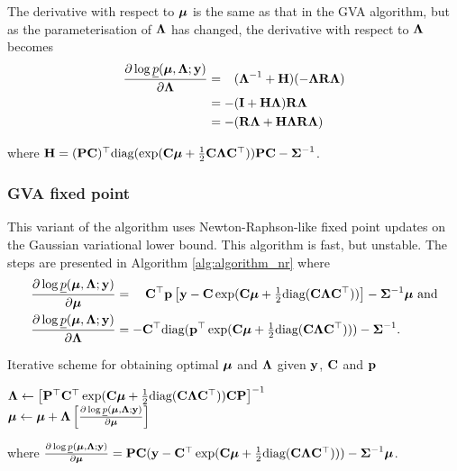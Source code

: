 \documentclass[times, doublespace]{anzsauth}
\begin{document}
	\noindent The derivative with respect to ${\boldsymbol \mu}$ is the same as that in the GVA algorithm, but as the parameterisation of
	${\boldsymbol \Lambda}$ has changed, the  derivative with respect to ${\boldsymbol \Lambda}$ becomes
	\begin{align*}
		\frac{\partial \log \underline{p}({\boldsymbol \mu}, {\boldsymbol \Lambda}; {\bf y})}{\partial {\boldsymbol\Lambda}}
		  & = \hphantom{-}({\boldsymbol \Lambda}^{-1} + {\bf H})(-{\boldsymbol \Lambda} {\bf R} {\boldsymbol \Lambda}) \\
		  & = -({\bf I} + {\bf H}{\boldsymbol \Lambda}){\bf R}{\boldsymbol \Lambda}                           \\
		  & = - ({\bf R}{\boldsymbol \Lambda} + {\bf H}{\boldsymbol \Lambda}{\bf R}{\boldsymbol \Lambda})                  
	\end{align*} 
		
	\noindent where ${\bf H} = ({\bf P} {\bf C})^\top \text{diag}(\exp({\bf C} {\boldsymbol \mu} + \tfrac{1}{2} {\bf C} {\boldsymbol \Lambda} {\bf C}^\top)) {\bf P} {\bf C} - {\boldsymbol \Sigma}^{-1}$.
		
	\subsubsection{GVA fixed point}
		
		
	This variant of the algorithm uses Newton-Raphson-like fixed point updates on the Gaussian variational lower
	bound. This algorithm is fast, but unstable. The steps are presented in Algorithm \ref{alg:algorithm_nr} where
	\begin{align*}
		\frac{\partial \log \underline{p}({\boldsymbol \mu}, {\boldsymbol \Lambda}; {\bf y})}{\partial {\boldsymbol\mu}}     & = \quad {\bf C}^\top{\bf p} \left [{\bf y} - {\bf C}\exp({\bf C} {\boldsymbol \mu} + \tfrac{1}{2} \text{diag}({\bf C} {\boldsymbol \Lambda} {\bf C}^\top)) \right ] - {\boldsymbol \Sigma}^{-1} {\boldsymbol \mu} \text{ and} \\
		\frac{\partial \log \underline{p}({\boldsymbol \mu}, {\boldsymbol \Lambda}; {\bf y})}{\partial {\boldsymbol\Lambda}} & = -{\bf C}^\top \text{diag}({\bf p}^\top \exp({\bf C} {\boldsymbol \mu} +\tfrac{1}{2} \text{diag}({\bf C} {\boldsymbol \Lambda} {\bf C}^\top))) - {\boldsymbol \Sigma}^{-1}.                             
	\end{align*}
		
	\begin{algorithm}
		\caption[Algorithm GVA NR]{Iterative scheme for obtaining optimal ${\boldsymbol \mu}$ and ${\boldsymbol \Lambda}$
			given ${\bf y}$, ${\bf C}$ and ${\bf p}$}
		\label{alg:algorithm_nr}
		\begin{algorithmic}
			\STATE ${\boldsymbol \Lambda} \leftarrow \left [ {\bf P}^\top {\bf C}^\top \exp({\bf C} {\boldsymbol \mu} + \tfrac{1}{2} \text{diag}({\bf C} {\boldsymbol \Lambda} {\bf C}^\top)) {\bf C} {\bf P} \right ]^{-1}$ \\ [1ex]
			\STATE ${\boldsymbol \mu} \leftarrow {\boldsymbol\mu} + {\boldsymbol \Lambda} \left [ \frac{\partial \log \underline{p}({\boldsymbol \mu}, {\boldsymbol \Lambda}; {\bf y})}{\partial {\boldsymbol\mu}} \right ]$
			\ENDWHILE
		\end{algorithmic}
		where $\frac{\partial \log \underline{p}({\boldsymbol \mu}, {\boldsymbol \Lambda}; {\bf y})}{\partial {\boldsymbol\mu}} = {\bf P} {\bf C} ({\bf y} - {\bf C}^\top \exp({\bf C} {\boldsymbol \mu} + \tfrac{1}{2} \text{diag}{({\bf C}{\boldsymbol\Lambda}{\bf C}^\top)})) - {\boldsymbol \Sigma}^{-1} {\boldsymbol \mu}$.
	\end{algorithm}
		
\end{document}
